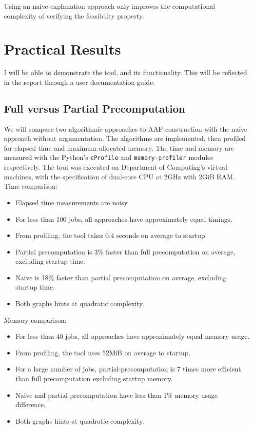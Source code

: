 Using an naive explanation approach only improves the computational complexity of verifying the feasibility property. 

\section{Practical Results} 

I will be able to demonstrate the tool, and its functionality. This will be reflected in the report through a user documentation guide.

\subsection{Full versus Partial Precomputation}

We will compare two algorithmic approaches to AAF construction with the naive approach without argumentation. The algorithms are implemented, then profiled for elapsed time and maximum allocated memory. The time and memory are measured with the Python's \texttt{cProfile} and \texttt{memory-profiler} modules respectively. The tool was executed on Department of Computing's virtual machines, with the specification of dual-core CPU at 2GHz with 2GiB RAM.
\linespace
Time comparison:
\begin{itemize}
	\item Elapsed time measurements are noisy.
	\item For less than 100 jobs, all approaches have approximately equal timings.
	\item From profiling, the tool takes 0.4 seconds on average to startup.
	\item Partial precomputation is 3\% faster than full precomputation on average, excluding startup time.
	\item Naive is 18\% faster than partial precomputation on average, excluding startup time.
	\item Both graphs hints at quadratic complexity.
\end{itemize}

Memory comparison:
\begin{itemize}
	\item For less than 40 jobs, all approaches have approximately equal memory usage.
	\item From profiling, the tool uses 52MiB on average to startup.
	\item For a large number of jobs, partial-precomputation is 7 times more efficient than full precomputation excluding startup memory.
	\item Naive and partial-precomputation have less than 1\% memory usage difference.
	\item Both graphs hints at quadratic complexity.
\end{itemize}

